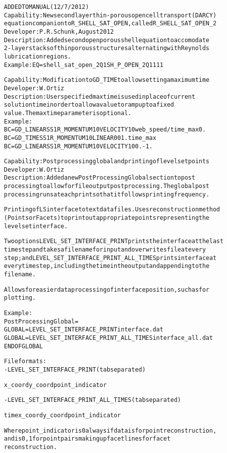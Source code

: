 \documentclass{article}
\begin{document}
\begin{alltt}
ADDED TO MANUAL (12/7/2012)
Capability:  New second layer thin-porous open cell transport (DARCY)
equation companion to R_SHELL_SAT_OPEN, called  R_SHELL_SAT_OPEN_2
Developer: P. R. Schunk, August 2012
Description:  Added second open porous shell equation to accomodate
2-layer stacks of thin porous structures alternating with Reynolds
lubrication regions. 
Example: EQ = shell_sat_open_2   Q1 SH_P_OPEN_2   Q1 1           1   1

Capability: Modification to GD_TIME to allow setting a maximum time
Developer: W. Ortiz
Description: User specified max time is used in place of current
solution time in order to allow a value to ramp up to a fixed
value. The max time parameter is optional.
Example:
BC = GD_LINEAR SS 1 R_MOMENTUM1 0 VELOCITY1 0 {web_speed/time_max} 0.
BC = GD_TIME   SS 1 R_MOMENTUM1 0 LINEAR 0 0 1. {time_max}
BC = GD_LINEAR SS 1 R_MOMENTUM1 0 VELOCITY1 0 0. -1.

Capability: Post processing global and printing of level set points
Developer: W. Ortiz
Description: Added a new Post Processing Global section to post
processing to allow for file output post processing. The global post
processing runs at each print so that it follows printing frequency.

Printing of LS interface to text datafiles. Uses reconstruction method
(Points or Facets) to print out appropriate points representing the
level set interface.

Two options LEVEL_SET_INTERFACE_PRINT prints the interface at the last
time step and takes a file name for input and overwrites file at every
step; and LEVEL_SET_INTERFACE_PRINT_ALL_TIMES prints interface at
every time step, including the time in the output and appending to the
filename.

Allows for easier data processing of interface position, such as for
plotting.

Example:
Post Processing Global =
GLOBAL = LEVEL_SET_INTERFACE_PRINT interface.dat
GLOBAL = LEVEL_SET_INTERFACE_PRINT_ALL_TIMES interface_all.dat
END OF GLOBAL

File formats:
- LEVEL_SET_INTERFACE_PRINT (tab separated)

x_coord y_coord point_indicator

- LEVEL_SET_INTERFACE_PRINT_ALL_TIMES (tab separated)

time x_coord y_coord point_indicator

Where point_indicator is 0 always if data is for point reconstruction,
and is 0, 1 for point pairs making up facet lines for facet
reconstruction.



\end{alltt}
\end{document}
